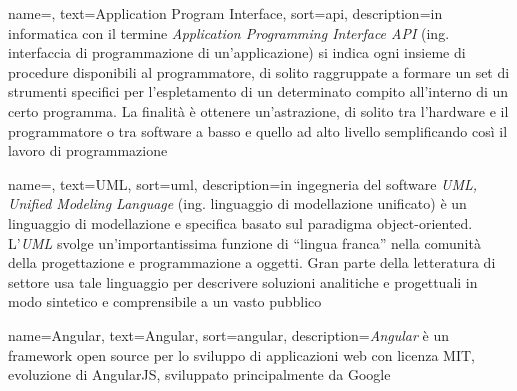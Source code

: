 
\renewcommand{\acronymname}{Acronimi e abbreviazioni}


    
    


{
    name=,
    text=Application Program Interface,
    sort=api,
    description={in informatica con il termine \emph{Application Programming Interface API} (ing. interfaccia di programmazione di un'applicazione) si indica ogni insieme di procedure disponibili al programmatore, di solito raggruppate a formare un set di strumenti specifici per l'espletamento di un determinato compito all'interno di un certo programma. La finalità è ottenere un'astrazione, di solito tra l'hardware e il programmatore o tra software a basso e quello ad alto livello semplificando così il lavoro di programmazione}
}

{
    name=,
    text=UML,
    sort=uml,
    description={in ingegneria del software \emph{UML, Unified Modeling Language} (ing. linguaggio di modellazione unificato) è un linguaggio di modellazione e specifica basato sul paradigma object-oriented. L'\emph{UML} svolge un'importantissima funzione di ``lingua franca'' nella comunità della progettazione e programmazione a oggetti. Gran parte della letteratura di settore usa tale linguaggio per descrivere soluzioni analitiche e progettuali in modo sintetico e comprensibile a un vasto pubblico}
}

{
    name={Angular},
    text=Angular,
    sort=angular,
    description={\emph{Angular} è un framework open source per lo sviluppo di applicazioni web con licenza MIT, evoluzione di AngularJS, sviluppato principalmente da Google}
}

